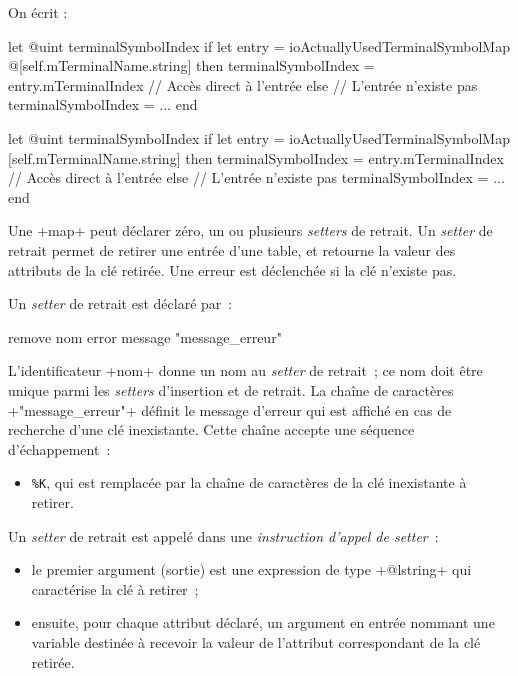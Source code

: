 On écrit :

\begin{galgas3}
let @uint terminalSymbolIndex
if let entry = ioActuallyUsedTerminalSymbolMap @[self.mTerminalName.string] then
  terminalSymbolIndex = entry.mTerminalIndex // Accès direct à l'entrée
else // L'entrée n'existe pas
  terminalSymbolIndex = ...
end
\end{galgas3}


\begin{galgas4}
let @uint terminalSymbolIndex
if let entry = ioActuallyUsedTerminalSymbolMap [self.mTerminalName.string] then
  terminalSymbolIndex = entry.mTerminalIndex // Accès direct à l'entrée
else // L'entrée n'existe pas
  terminalSymbolIndex = ...
end
\end{galgas4}










Une \ggst+map+ peut déclarer zéro, un ou plusieurs \emph{setters} de retrait. Un \emph{setter} de retrait permet de retirer une entrée d'une table, et retourne la valeur des attributs de la clé retirée. Une erreur est déclenchée si la clé n'existe pas.


Un \emph{setter} de retrait est déclaré par~:

\begin{galgas3}
remove nom error message "message_erreur"
\end{galgas3}

\begin{galgas4}
\end{galgas4}

L'identificateur \ggst+nom+ donne un nom au \emph{setter} de retrait~; ce nom doit être unique parmi les \emph{setters} d'insertion et de retrait. La chaîne de caractères \ggst+"message_erreur"+ définit le message d'erreur qui est affiché en cas de recherche d'une clé inexistante. Cette chaîne accepte une séquence d'échappement~:
\begin{itemize}
  \item \texttt{\%K}, qui est remplacée par la chaîne de caractères de la clé inexistante à retirer.
\end{itemize}


Un \emph{setter} de retrait est appelé dans une \emph{instruction d'appel de setter}~:
\begin{itemize}
  \item le premier argument (sortie) est une expression de type \ggst+@lstring+ qui caractérise la clé à retirer~;
  \item ensuite, pour chaque attribut déclaré, un argument en entrée nommant une variable destinée à recevoir la valeur de l'attribut correspondant de la clé retirée.
\end{itemize}

